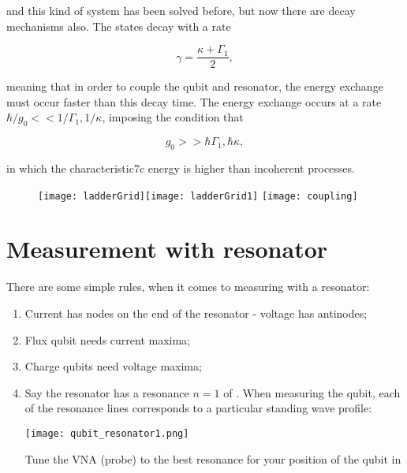 \noindent and this kind of system has been solved before, but now there are decay
mechanisms also.  The states decay with a rate

\begin{equation}\label{ardecay}
  \gamma=\frac{\kappa+\Gamma_1}{2},
\end{equation}

\noindent meaning  that in order  to couple the  qubit and resonator,  the energy
exchange must occur faster than this decay time.  The energy exchange occurs at a
rate $ \hbar/g_0 << 1/\Gamma_1,1/\kappa$, imposing the condition that

\begin{equation}\label{arD}
  g_0>>\hbar\Gamma_1,\hbar\kappa,
\end{equation}

\noindent  in  which  the  characteristic7c  energy  is  higher  than  incoherent
processes.

\begin{figure}[h]
  \centering%
  \texttt{[image: ladderGrid]}\texttt{[image: ladderGrid1]}
  \texttt{[image: coupling]}
\end{figure}


\newpage
\section{Measurement with resonator}
\label{sec:meas-with-reson}

There are some simple rules, when it comes to measuring with a resonator:

\begin{framed}\noindent
  \begin{enumerate}
  \item Current has nodes on the end of the resonator - voltage has antinodes;
  \item Flux qubit needs current maxima;
  \item Charge qubits need voltage maxima;
  \item Say  the resonator has  a resonance  $ n =  1 $ of  .  When
    measuring the qubit, each of the  resonance lines corresponds to a particular
    standing wave profile:
    \begin{center}
      \texttt{[image: qubit\_resonator1.png]}
    \end{center}
    \noindent Tune the VNA (probe) to the best resonance for your position of the
    qubit in 
  \end{enumerate}
\end{framed}

